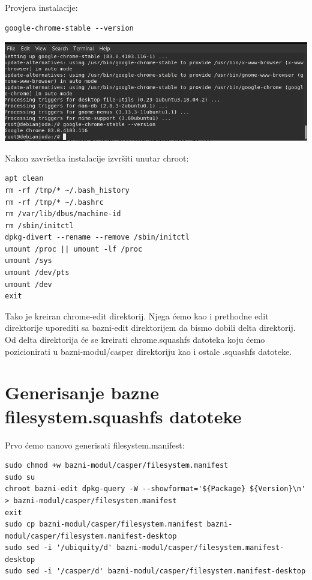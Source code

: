\documentclass[12pt,vi]{mitthesis}
\begin{document}
Provjera instalacije:
\begin{lstlisting}[style=BashInputStyle]
google-chrome-stable --version
\end{lstlisting}
\includegraphics[width=\linewidth]{images/googlechromestableversion.png} 

\noindent
Nakon završetka instalacije izvršiti unutar chroot:
\begin{lstlisting}[style=BashInputStyle]
apt clean
rm -rf /tmp/* ~/.bash_history
rm -rf /tmp/* ~/.bashrc
rm /var/lib/dbus/machine-id
rm /sbin/initctl
dpkg-divert --rename --remove /sbin/initctl
umount /proc || umount -lf /proc
umount /sys
umount /dev/pts
umount /dev
exit
\end{lstlisting}

Tako je kreiran chrome-edit direktorij. Njega ćemo kao i prethodne edit direktorije uporediti sa bazni-edit direktorijem da bismo dobili delta direktorij. Od delta direktorija će se kreirati chrome.squashfs datoteka koju ćemo pozicionirati u bazni-modul/casper direktoriju kao i ostale .squashfs datoteke.

\section*{Generisanje bazne filesystem.squashfs datoteke}
\indent
Prvo ćemo nanovo generisati filesystem.manifest:
\begin{lstlisting}[style=BashInputStyle]
sudo chmod +w bazni-modul/casper/filesystem.manifest
sudo su
chroot bazni-edit dpkg-query -W --showformat='${Package} ${Version}\n' > bazni-modul/casper/filesystem.manifest
exit
sudo cp bazni-modul/casper/filesystem.manifest bazni-modul/casper/filesystem.manifest-desktop
sudo sed -i '/ubiquity/d' bazni-modul/casper/filesystem.manifest-desktop
sudo sed -i '/casper/d' bazni-modul/casper/filesystem.manifest-desktop
\end{lstlisting}
\end{document}
